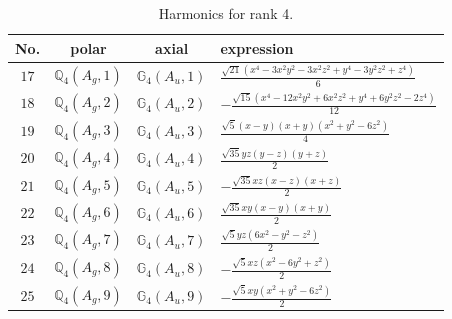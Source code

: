 \documentclass[fleqn,8pt,landscape]{jsarticle}
\begin{document}
\begin{table}[ht!]
\begin{center}
\caption{Harmonics for rank 4.}
\renewcommand{\arraystretch}{1.3}
\begin{tabular}{cccl} \hline \hline
No. & polar & axial & expression \\ \hline
$ 17 $ & $ \mathbb{Q}_{4}(A_{g},1) $ & $ \mathbb{G}_{4}(A_{u},1) $ & $ \frac{\sqrt{21} \left(x^{4} - 3 x^{2} y^{2} - 3 x^{2} z^{2} + y^{4} - 3 y^{2} z^{2} + z^{4}\right)}{6} $ \\
$ 18 $ & $ \mathbb{Q}_{4}(A_{g},2) $ & $ \mathbb{G}_{4}(A_{u},2) $ & $ - \frac{\sqrt{15} \left(x^{4} - 12 x^{2} y^{2} + 6 x^{2} z^{2} + y^{4} + 6 y^{2} z^{2} - 2 z^{4}\right)}{12} $ \\
$ 19 $ & $ \mathbb{Q}_{4}(A_{g},3) $ & $ \mathbb{G}_{4}(A_{u},3) $ & $ \frac{\sqrt{5} \left(x - y\right) \left(x + y\right) \left(x^{2} + y^{2} - 6 z^{2}\right)}{4} $ \\
$ 20 $ & $ \mathbb{Q}_{4}(A_{g},4) $ & $ \mathbb{G}_{4}(A_{u},4) $ & $ \frac{\sqrt{35} y z \left(y - z\right) \left(y + z\right)}{2} $ \\
$ 21 $ & $ \mathbb{Q}_{4}(A_{g},5) $ & $ \mathbb{G}_{4}(A_{u},5) $ & $ - \frac{\sqrt{35} x z \left(x - z\right) \left(x + z\right)}{2} $ \\
$ 22 $ & $ \mathbb{Q}_{4}(A_{g},6) $ & $ \mathbb{G}_{4}(A_{u},6) $ & $ \frac{\sqrt{35} x y \left(x - y\right) \left(x + y\right)}{2} $ \\
$ 23 $ & $ \mathbb{Q}_{4}(A_{g},7) $ & $ \mathbb{G}_{4}(A_{u},7) $ & $ \frac{\sqrt{5} y z \left(6 x^{2} - y^{2} - z^{2}\right)}{2} $ \\
$ 24 $ & $ \mathbb{Q}_{4}(A_{g},8) $ & $ \mathbb{G}_{4}(A_{u},8) $ & $ - \frac{\sqrt{5} x z \left(x^{2} - 6 y^{2} + z^{2}\right)}{2} $ \\
$ 25 $ & $ \mathbb{Q}_{4}(A_{g},9) $ & $ \mathbb{G}_{4}(A_{u},9) $ & $ - \frac{\sqrt{5} x y \left(x^{2} + y^{2} - 6 z^{2}\right)}{2} $ \\
 \hline \hline
\end{tabular}
\end{center}
\end{table}
\end{document}

